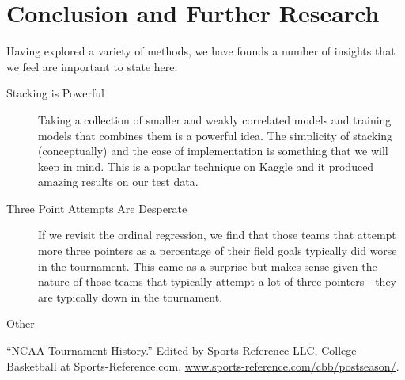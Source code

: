\documentclass[10pt,a4paper, hidelinks]{article} %
\begin{document}
\section{Conclusion and Further Research}

Having explored a variety of methods, we have founds a number of insights that we feel are important to state here:
\begin{description}
	\item[Stacking is Powerful] Taking a collection of smaller and weakly correlated models and training models that combines them is a powerful idea. The simplicity of stacking (conceptually) and the ease of implementation is something that we will keep in mind. This is a popular technique on Kaggle and it produced amazing results on our test data.
	\item[Three Point Attempts Are Desperate] If we revisit the ordinal regression, we find that those teams that attempt more three pointers as a percentage of their field goals typically did worse in the tournament. This came as a surprise but makes sense given the nature of those teams that typically attempt a lot of three pointers - they are typically down in the tournament.  
	\item[Other] 
\end{description}




\newpage
\begin{thebibliography}{9}
	
	“NCAA Tournament History.” Edited by Sports Reference LLC, College Basketball at Sports-Reference.com, {\color{blue} \url{www.sports-reference.com/cbb/postseason/}}.
	
\end{thebibliography}
\end{document}
